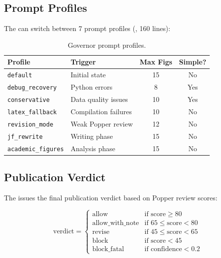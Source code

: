 \subsection{Prompt Profiles}

The \governor can switch between 7 prompt profiles (, 160 lines):

\begin{table}[H]
\centering
\caption{Governor prompt profiles.}
\label{tab:governor-profiles}
\begin{tabularx}{\textwidth}{lXcc}
\toprule
\textbf{Profile} & \textbf{Trigger} & \textbf{Max Figs} & \textbf{Simple?} \\
\midrule
\texttt{default} & Initial state & 15 & No \\
\texttt{debug\_recovery} & Python errors & 8 & Yes \\
\texttt{conservative} & Data quality issues & 10 & Yes \\
\texttt{latex\_fallback} & Compilation failures & 10 & No \\
\texttt{revision\_mode} & Weak Popper review & 12 & No \\
\texttt{jf\_rewrite} & Writing phase & 15 & No \\
\texttt{academic\_figures} & Analysis phase & 15 & No \\
\bottomrule
\end{tabularx}
\end{table}

\subsection{Publication Verdict}

The \governor issues the final publication verdict based on Popper review scores:

\begin{equation}
\text{verdict} = \begin{cases}
  \text{allow} & \text{if score} \geq 80 \\
  \text{allow\_with\_note} & \text{if } 65 \leq \text{score} < 80 \\
  \text{revise} & \text{if } 45 \leq \text{score} < 65 \\
  \text{block} & \text{if score} < 45 \\
  \text{block\_fatal} & \text{if confidence} < 0.2
\end{cases}
\label{eq:pub-verdict}
\end{equation}

